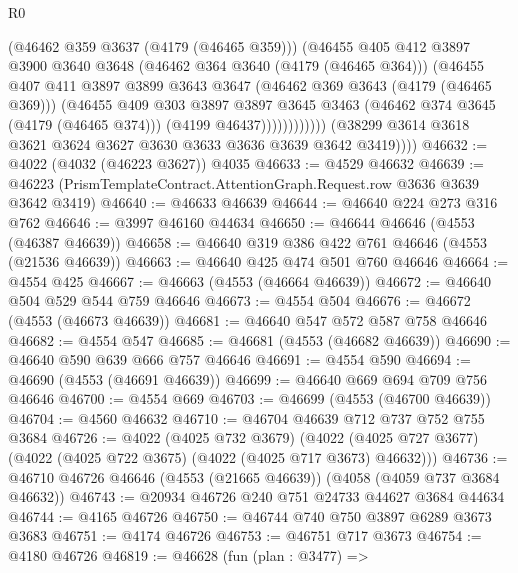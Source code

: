 \begin{lexlean}{R0}
\begin{coremodule}
                          (@46462 @359 @3637 (@4179 (@46465 @359)))
                          (@46455
                            @405
                            @412
                            @3897
                            @3900
                            @3640
                            @3648
                            (@46462 @364 @3640 (@4179 (@46465 @364)))
                            (@46455
                              @407
                              @411
                              @3897
                              @3899
                              @3643
                              @3647
                              (@46462 @369 @3643 (@4179 (@46465 @369)))
                              (@46455
                                @409
                                @303
                                @3897
                                @3897
                                @3645
                                @3463
                                (@46462 @374 @3645 (@4179 (@46465 @374)))
                                (@4199 @46437))))))))))))
          (@38299 @3614 @3618 @3621 @3624 @3627 @3630 @3633 @3636 @3639 @3642 @3419))))
@46632 := @4022 (@4032 (@46223 @3627)) @4035
@46633 := @4529 @46632
@46639 := @46223 (PrismTemplateContract.AttentionGraph.Request.row @3636 @3639 @3642 @3419)
@46640 := @46633 @46639
@46644 := @46640 @224 @273 @316 @762
@46646 := @3997 @46160 @44634
@46650 := @46644 @46646 (@4553 (@46387 @46639))
@46658 := @46640 @319 @386 @422 @761 @46646 (@4553 (@21536 @46639))
@46663 := @46640 @425 @474 @501 @760 @46646
@46664 := @4554 @425
@46667 := @46663 (@4553 (@46664 @46639))
@46672 := @46640 @504 @529 @544 @759 @46646
@46673 := @4554 @504
@46676 := @46672 (@4553 (@46673 @46639))
@46681 := @46640 @547 @572 @587 @758 @46646
@46682 := @4554 @547
@46685 := @46681 (@4553 (@46682 @46639))
@46690 := @46640 @590 @639 @666 @757 @46646
@46691 := @4554 @590
@46694 := @46690 (@4553 (@46691 @46639))
@46699 := @46640 @669 @694 @709 @756 @46646
@46700 := @4554 @669
@46703 := @46699 (@4553 (@46700 @46639))
@46704 := @4560 @46632
@46710 := @46704 @46639 @712 @737 @752 @755 @3684
@46726 := @4022
    (@4025 @732 @3679)
    (@4022 (@4025 @727 @3677) (@4022 (@4025 @722 @3675) (@4022 (@4025 @717 @3673) @46632)))
@46736 := @46710 @46726 @46646 (@4553 (@21665 @46639)) (@4058 (@4059 @737 @3684 @46632))
@46743 := @20934 @46726 @240 @751 @24733 @44627 @3684 @44634
@46744 := @4165 @46726
@46750 := @46744 @740 @750 @3897 @6289 @3673 @3683
@46751 := @4174 @46726
@46753 := @46751 @717 @3673
@46754 := @4180 @46726
@46819 := @46628
    (fun (plan : @3477) =>

\end{coremodule}
\end{lexlean}
